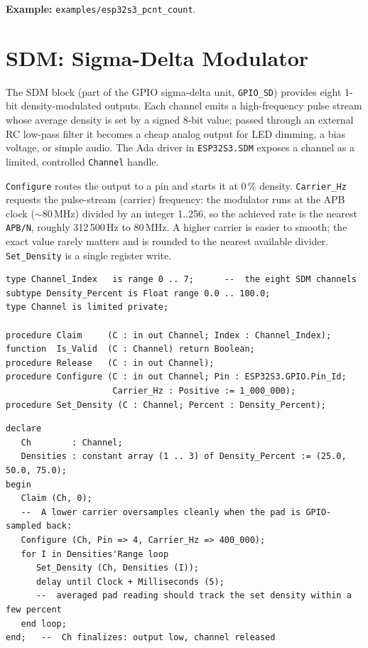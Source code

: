 \noindent\textbf{Example:} \texttt{examples/esp32s3\_pcnt\_count}.

\section{SDM: Sigma-Delta Modulator}
\label{app:int:sdm}

The SDM block (part of the GPIO sigma-delta unit, \texttt{GPIO\_SD}) provides
eight 1-bit density-modulated outputs. Each channel emits a high-frequency pulse
stream whose average density is set by a signed 8-bit value; passed through an
external RC low-pass filter it becomes a cheap analog output for LED dimming, a
bias voltage, or simple audio. The Ada driver in \texttt{ESP32S3.SDM} exposes a
channel as a limited, controlled \texttt{Channel} handle.

\texttt{Configure} routes the output to a pin and starts it at 0\,\% density.
\texttt{Carrier\_Hz} requests the pulse-stream (carrier) frequency: the modulator
runs at the APB clock ($\sim$80\,MHz) divided by an integer 1..256, so the
achieved rate is the nearest \texttt{APB/N}, roughly 312\,500\,Hz to 80\,MHz. A
higher carrier is easier to smooth; the exact value rarely matters and is rounded
to the nearest available divider. \texttt{Set\_Density} is a single register
write.

\begin{lstlisting}
type Channel_Index   is range 0 .. 7;      --  the eight SDM channels
subtype Density_Percent is Float range 0.0 .. 100.0;
type Channel is limited private;

procedure Claim     (C : in out Channel; Index : Channel_Index);
function  Is_Valid  (C : Channel) return Boolean;
procedure Release   (C : in out Channel);
procedure Configure (C : in out Channel; Pin : ESP32S3.GPIO.Pin_Id;
                     Carrier_Hz : Positive := 1_000_000);
procedure Set_Density (C : Channel; Percent : Density_Percent);
\end{lstlisting}

\begin{lstlisting}
declare
   Ch        : Channel;
   Densities : constant array (1 .. 3) of Density_Percent := (25.0, 50.0, 75.0);
begin
   Claim (Ch, 0);
   --  A lower carrier oversamples cleanly when the pad is GPIO-sampled back:
   Configure (Ch, Pin => 4, Carrier_Hz => 400_000);
   for I in Densities'Range loop
      Set_Density (Ch, Densities (I));
      delay until Clock + Milliseconds (5);
      --  averaged pad reading should track the set density within a few percent
   end loop;
end;   --  Ch finalizes: output low, channel released
\end{lstlisting}

